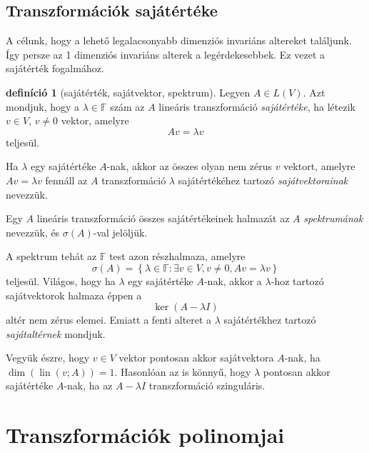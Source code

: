 \documentclass[9pt, a4paper, showtrims]{memoir}
\theoremstyle{plain}
\theoremstyle{remark}
\theoremstyle{definition}
\newtheorem{definition}[proposition]{definíció}
\DeclareMathOperator{\lin}{lin}
\begin{document}
    \section{Transzformációk sajátértéke}
    A célunk, hogy a lehető legalacsonyabb dimenziós invariáns altereket találjunk.
    Így persze az 1 dimenziós invariáns alterek a legérdekesebbek.
    Ez vezet a sajátérték fogalmához.
    \begin{definition}[sajátérték, sajátvektor, spektrum]
        Legyen $A\in L\left( V \right)$.
        Azt mondjuk, hogy a $\lambda\in\mathbb{F}$ szám az $A$ lineáris transzformáció
        \emph{sajátértéke},
        ha létezik $v\in V$, $v\neq 0$ vektor, amelyre
        \[
            Av=\lambda v
        \]
        teljesül.

        Ha $\lambda$ egy sajátértéke $A$-nak,
        akkor az összes olyan nem zérus $v$ vektort, 
        amelyre $Av=\lambda v$ fennáll az $A$ transzformáció $\lambda$ sajátértékéhez tartozó
        \emph{sajátvektorainak} nevezzük.

        Egy $A$ lineáris transzformáció összes sajátértékeinek halmazát az
        $A$ \emph{spektrumának} nevezzük, és
        $\sigma\left( A \right)$-val jelöljük.
    \end{definition}
    A spektrum tehát az $\mathbb{F}$ test azon részhalmaza, amelyre
    \[
        \sigma\left( A \right)
        =
        \left\{ 
            \lambda\in\mathbb{F}:\exists v\in V, v\neq 0, Av=\lambda v
        \right\}
    \]
    teljesül.
    Világos, hogy ha $\lambda$ egy sajátértéke $A$-nak, akkor a $\lambda$-hoz tartozó
    sajátvektorok halmaza éppen a 
    \[
        \ker\left( A-\lambda I \right)
    \]
    altér nem zérus elemei.
    Emiatt a fenti alteret a $\lambda$ sajátértékhez tartozó \emph{sajátaltérnek}
    mondjuk.

    Vegyük észre, 
    hogy $v\in V$ vektor pontosan akkor sajátvektora $A$-nak, ha $\dim\left( \lin\left( v;A \right) \right)=1$.
    Hasonlóan az is könnyű, hogy $\lambda$ pontosan akkor sajátértéke $A$-nak,
    ha az $A-\lambda I$ transzformáció szinguláris.

\chapter{Transzformációk polinomjai}
\end{document}
